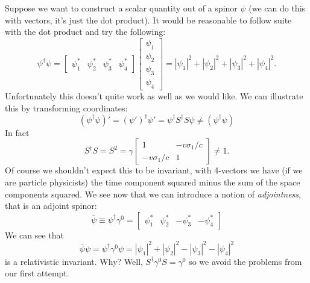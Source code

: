 Suppose we want to construct a scalar quantity out of a spinor $\psi$ (we can
do this with vectors, it's just the dot product). It would be reasonable to
follow suite with the dot product and try the following:
\begin{equation}
\psi^\dag\psi = \begin{bmatrix}\psi^{*}_1 & \psi^{*}_2 & \psi^{*}_3 & \psi^{*}_4\end{bmatrix}
\begin{bmatrix}
\psi_1\\
\psi_2\\
\psi_3\\
\psi_4
\end{bmatrix} = |\psi_1|^2 + |\psi_2|^2 + |\psi_3|^2 + |\psi_4|^2.
\end{equation}
Unfortunately this doesn't quite work as well as we would like. We can illustrate
this by transforming coordinates:
\begin{equation}
(\psi^\dag\psi)' = (\psi')^\dag\psi' = \psi^\dag S^\dag S\psi\ne (\psi^\dag\psi)
\end{equation}
In fact
\begin{equation}
S^\dag S = S^2 = \gamma \begin{bmatrix} 1 & -v\sigma_1/c\\
-v\sigma_1/c & 1\end{bmatrix} \ne 1.
\end{equation}
Of course we shouldn't expect this to be invariant, with 4-vectors we have
(if we are particle physicists) the time component squared minus the sum of the
space components squared. We see now that we can introduce a notion of \emph{adjointness}, 
that is an adjoint spinor:
\begin{equation}
\bar{\psi} \equiv \psi^\dag\gamma^0 = \begin{bmatrix}\psi^*_1 & \psi^*_2 & -\psi^*_3 & -\psi^*_4\end{bmatrix}
\end{equation}
We can see that
\begin{equation}
\bar{\psi}\psi = \psi^\dag\gamma^0\psi = |\psi_1|^2 + |\psi_2|^2 - |\psi_3|^2 - |\psi_4|^2
\end{equation}
is a relativistic invariant. Why? Well, $S^\dag\gamma^0 S=\gamma^0$ so we avoid
the problems from our first attempt.
